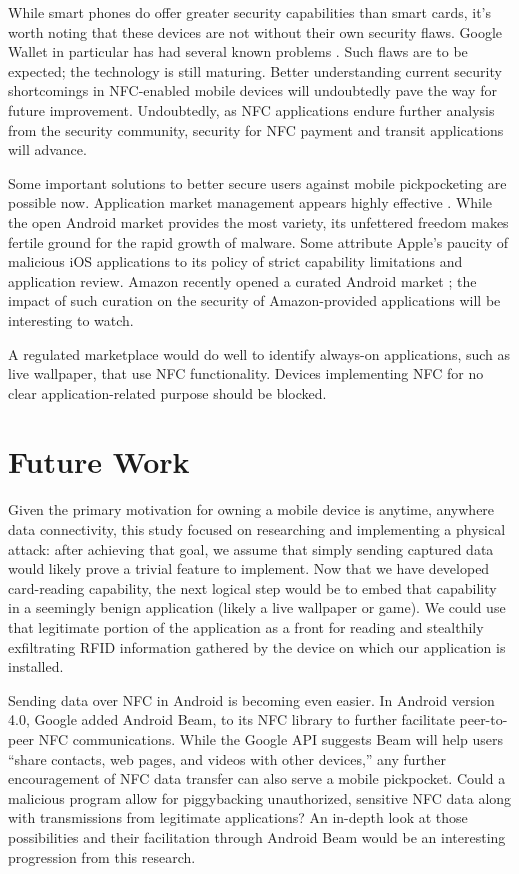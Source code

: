 \documentclass{IEEEtran}
\begin{document}
While smart phones do offer greater security capabilities than smart cards, it's worth noting that these devices are not without their own security flaws.  Google Wallet in particular has had several known problems \cite{google-wallet-pin-cracked} \cite{smartphonechamp-second-major-flaw-google-wallet}.  Such flaws are to be expected; the technology is still maturing.  Better understanding current security shortcomings in NFC-enabled mobile devices will undoubtedly pave the way for future improvement.  Undoubtedly, as NFC applications endure further analysis from the security community, security for NFC payment and transit applications will advance.  

Some important solutions to better secure users against mobile pickpocketing are possible now.  Application market management appears highly effective \cite{electronista-mcafee-malware-surge}.  While the open Android market provides the most variety, its unfettered freedom makes fertile ground for the rapid growth of malware.  Some attribute Apple's paucity of malicious iOS applications to its policy of strict capability limitations and application review.  Amazon recently opened a curated Android market \cite{amazon-android-appstore}; the impact of such curation on the security of Amazon-provided applications will be interesting to watch.  

A regulated marketplace would do well to identify always-on applications, such as live wallpaper, that use NFC functionality.  Devices implementing NFC for no clear application-related purpose should be blocked.

\section{Future Work}
Given the primary motivation for owning a mobile device is anytime, anywhere data connectivity, this study focused on researching and implementing a physical attack:  after achieving that goal, we assume that simply sending captured data would likely prove a trivial feature to implement.  Now that we have developed card-reading capability, the next logical step would be to embed that capability in a seemingly benign application (likely a live wallpaper or game).  We could use that legitimate portion of the application as a front for reading and stealthily exfiltrating RFID information gathered by the device on which our application is installed.  

Sending data over NFC in Android is becoming even easier.  In Android version 4.0, Google added Android Beam, \cite{ieee-beacon-mobileos-review} to its NFC library to further facilitate peer-to-peer NFC communications.  While the Google API suggests Beam will help users ``share contacts, web pages, and videos with other devices,'' \cite{android-developers-beam} any further encouragement of NFC data transfer can also serve a mobile pickpocket.  Could a malicious program allow for piggybacking unauthorized, sensitive NFC data along with transmissions from legitimate applications?  An in-depth look at those possibilities and their facilitation through Android Beam would be an interesting progression from this research.       
\end{document}
